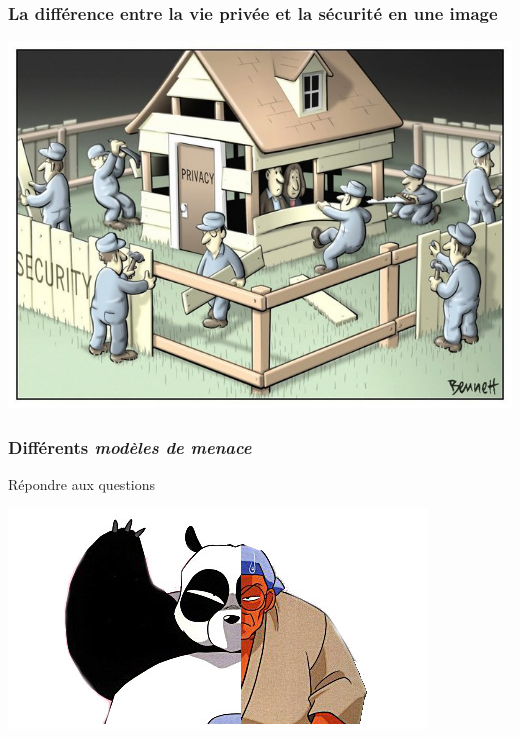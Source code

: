 \documentclass{beamer}
\begin{document}
\begin{frame}
\frametitle{La différence entre la vie privée et la sécurité en une image}
\begin{center}
\includegraphics[scale=0.4]{./images/Security_Privacy.jpg}
\end{center}
\end{frame}

\begin{frame}
\frametitle{Différents \emph{modèles de menace}}
\begin{block}{Répondre aux questions}
\end{block}

\begin{center}
\includegraphics[scale=0.4]{./images/bannierepseudonymat.jpg}
\end{center}
\end{frame}
\end{document}
